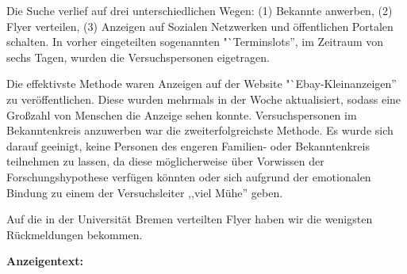 \documentclass{Bericht}
\begin{document}
Die Suche verlief auf drei unterschiedlichen Wegen: (1) Bekannte anwerben, (2) Flyer verteilen, (3) Anzeigen auf Sozialen Netzwerken und öffentlichen Portalen schalten. In vorher eingeteilten sogenannten "`Terminslots'', im Zeitraum von sechs Tagen, wurden die Versuchspersonen eigetragen. 

Die effektivste Methode waren Anzeigen auf der Website "`Ebay-Kleinanzeigen'' zu veröffentlichen. Diese wurden mehrmals in der Woche aktualisiert, sodass eine Großzahl von Menschen die Anzeige sehen konnte.
Versuchspersonen im Bekanntenkreis anzuwerben war die zweiterfolgreichste Methode. Es wurde sich darauf geeinigt, keine Personen des engeren Familien- oder Bekanntenkreis teilnehmen zu lassen, da diese möglicherweise über Vorwissen der Forschungshypothese verfügen könnten oder sich aufgrund der emotionalen Bindung zu einem der Versuchsleiter ,,viel Mühe'' geben.





 

Auf die in der Universität Bremen verteilten Flyer haben wir die wenigsten Rückmeldungen bekommen.

\textbf{Anzeigentext:}
\end{document}
